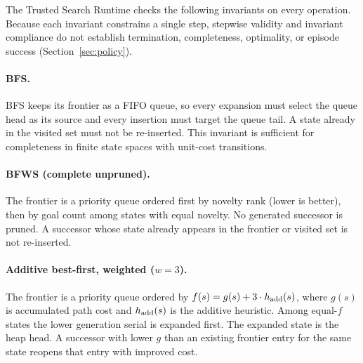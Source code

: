 The Trusted Search Runtime checks the following invariants on every operation. Because each invariant constrains a single step, stepwise validity and invariant compliance do not establish termination, completeness, optimality, or episode success (Section~\ref{sec:policy}).

\paragraph{BFS.}
BFS keeps its frontier as a FIFO queue, so every expansion must select the queue head as its source and every insertion must target the queue tail. A state already in the visited set must not be re-inserted. This invariant is sufficient for completeness in finite state spaces with unit-cost transitions.

\paragraph{BFWS (complete unpruned).}
The frontier is a priority queue ordered first by novelty rank (lower is better), then by goal count among states with equal novelty. No generated successor is pruned. A successor whose state already appears in the frontier or visited set is not re-inserted.

\paragraph{Additive best-first, weighted ($w = 3$).}
The frontier is a priority queue ordered by $f(s) = g(s) + 3 \cdot h_{\rm add}(s)$, where $g(s)$ is accumulated path cost and $h_{\rm add}(s)$ is the additive heuristic. Among equal-$f$ states the lower generation serial is expanded first. The expanded state is the heap head. A successor with lower $g$ than an existing frontier entry for the same state reopens that entry with improved cost.

